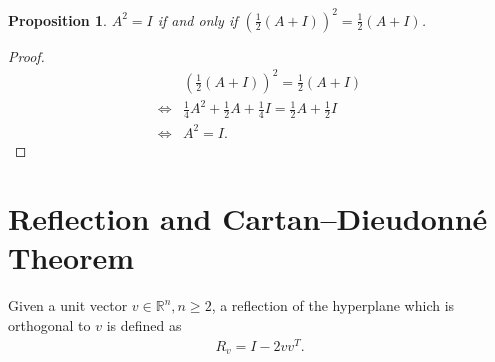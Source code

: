 \documentclass[10pt]{book}
\newtheorem{proposition}{Proposition}[chapter]
\theoremstyle{definition}
\numberwithin{equation}{chapter}
\begin{document}
\begin{subappendices}
\medskip

\begin{proposition}
$A^2 = I$ if and only if $\left(\frac{1}{2} (A + I) \right)^2 = \frac{1}{2} (A + I)$.
\end{proposition}
\begin{proof}
\begin{align*}
    & \left(\frac{1}{2} (A + I) \right)^2 = \frac{1}{2}(A + I) \\
    \Longleftrightarrow & \frac{1}{4} A^2 + \frac{1}{2} A + \frac{1}{4} I = \frac{1}{2} A + \frac{1}{2} I \\
    \Longleftrightarrow & A^2 = I.
\end{align*}
\end{proof}

\medskip

\section{Reflection and Cartan–Dieudonné Theorem}\label{appendix_reflection}

Given a unit vector $v \in \mathbb{R}^n, n \geq 2$, a reflection of the hyperplane which is orthogonal to $v$ is defined as 
\begin{align*}
    R_v = I - 2 v v^T.
\end{align*}


\end{subappendices}
\end{document}
